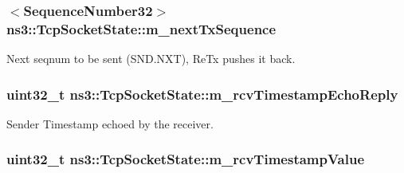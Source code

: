 \subsubsection[{\texorpdfstring{m\+\_\+next\+Tx\+Sequence}{m_nextTxSequence}}]{$<${\bf Sequence\+Number32}$>$ ns3\+::\+Tcp\+Socket\+State\+::m\+\_\+next\+Tx\+Sequence}\hypertarget{classns3_1_1TcpSocketState_ad1f77b1cbdb9267a89ebb6f16ac76892}{}\label{classns3_1_1TcpSocketState_ad1f77b1cbdb9267a89ebb6f16ac76892}


Next seqnum to be sent (S\+N\+D.\+N\+XT), Re\+Tx pushes it back. 

\subsubsection[{\texorpdfstring{m\+\_\+rcv\+Timestamp\+Echo\+Reply}{m_rcvTimestampEchoReply}}]{\setlength{\rightskip}{0pt plus 5cm}uint32\+\_\+t ns3\+::\+Tcp\+Socket\+State\+::m\+\_\+rcv\+Timestamp\+Echo\+Reply}\hypertarget{classns3_1_1TcpSocketState_a930be195736a97e37b7a1f92360b6261}{}\label{classns3_1_1TcpSocketState_a930be195736a97e37b7a1f92360b6261}


Sender Timestamp echoed by the receiver. 

\subsubsection[{\texorpdfstring{m\+\_\+rcv\+Timestamp\+Value}{m_rcvTimestampValue}}]{\setlength{\rightskip}{0pt plus 5cm}uint32\+\_\+t ns3\+::\+Tcp\+Socket\+State\+::m\+\_\+rcv\+Timestamp\+Value}\hypertarget{classns3_1_1TcpSocketState_af590aa7004c1b09e4e20defd75a7e84a}{}\label{classns3_1_1TcpSocketState_af590aa7004c1b09e4e20defd75a7e84a}


